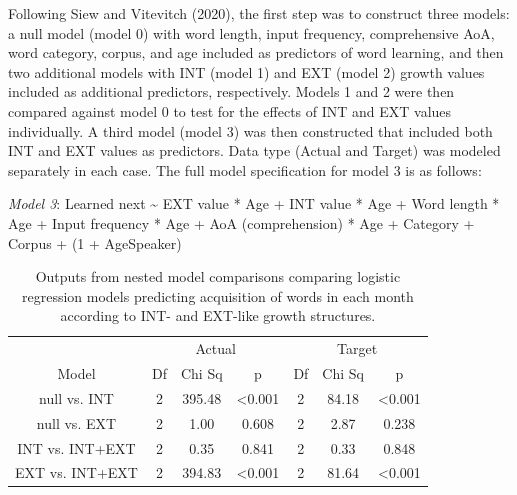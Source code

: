 \documentclass[
  man]{apa6}
\begin{document}
Following Siew and Vitevitch (2020), the first step was to construct three models: a null model (model 0) with word length, input frequency, comprehensive AoA, word category, corpus, and age included as predictors of word learning, and then two additional models with INT (model 1) and EXT (model 2) growth values included as additional predictors, respectively. Models 1 and 2 were then compared against model 0 to test for the effects of INT and EXT values individually. A third model (model 3) was then constructed that included both INT and EXT values as predictors. Data type (Actual and Target) was modeled separately in each case. The full model specification for model 3 is as follows:

\emph{Model 3}: Learned next \textasciitilde{}
EXT value * Age +
INT value * Age +
Word length * Age +
Input frequency * Age +
AoA (comprehension) * Age +
Category +
Corpus +
(1 + Age\textbar Speaker)

\begin{longtable}[t]{ccccccc}
\caption{\label{tab:table-model-outputs}Outputs from nested model comparisons comparing logistic regression models predicting acquisition of words in each month according to INT- and EXT-like growth structures.}\\
\toprule
\multicolumn{1}{c}{ } & \multicolumn{3}{c}{Actual} & \multicolumn{3}{c}{Target} \\
\cmidrule(l{3pt}r{3pt}){2-4} \cmidrule(l{3pt}r{3pt}){5-7}
Model & Df & Chi Sq & p & Df & Chi Sq & p\\
\midrule
null vs. INT & 2 & 395.48 & <0.001 & 2 & 84.18 & <0.001\\
null vs. EXT & 2 & 1.00 & 0.608 & 2 & 2.87 & 0.238\\
INT vs. INT+EXT & 2 & 0.35 & 0.841 & 2 & 0.33 & 0.848\\
EXT vs. INT+EXT & 2 & 394.83 & <0.001 & 2 & 81.64 & <0.001\\
\midrule
\bottomrule
\end{longtable}

\begingroup\fontsize{5}{7}\selectfont
\end{document}
